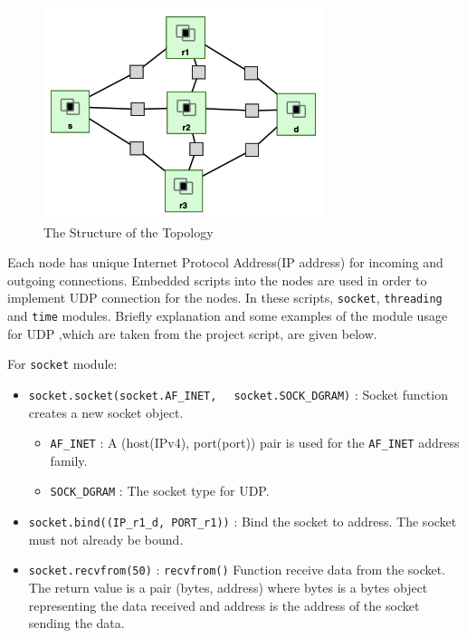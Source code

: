 \documentclass[conference]{IEEEtran}
\begin{document}
\begin{figure}[h]
    \centering
    \includegraphics[width=8 cm, height=4 cm]{TheStructureOfTopology.png}
    \caption{The Structure of the Topology}
    \label{fig}
\end{figure}

Each node has unique Internet Protocol Address(IP address) for incoming and outgoing connections.  Embedded scripts into the nodes are used in order to implement UDP connection for the nodes. In these scripts, \verb|socket|, \verb|threading| and \verb|time| modules. Briefly explanation and some examples of the module usage for UDP ,which are taken from the project script, are given below.

For \verb|socket| module:
\begin{itemize}

    \item \verb|socket.socket(socket.AF_INET,|            \verb|  socket.SOCK_DGRAM)| : Socket function creates a new socket object.
        \begin{itemize}
        
        \item \verb|AF_INET| : A (host(IPv4), port(port)) pair is used for the \verb|AF_INET| address family. 
        
        \item \verb|SOCK_DGRAM| : The socket type for UDP. \\
        
        \end{itemize}
    
    \item \verb|socket.bind((IP_r1_d, PORT_r1))| : Bind the socket to address. The socket must not already be bound. \\

    \item \verb|socket.recvfrom(50)| : \verb|recvfrom()| Function receive data from the socket. The return value is a pair (bytes, address) where bytes is a bytes object representing the data received and address is the address of the socket sending the data. \\

\end{itemize}
\end{document}
